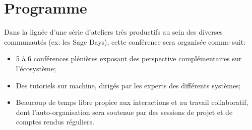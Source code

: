 \documentclass[12pt]{amsart}
\begin{document}
\section*{Programme}
Dans la lignée d'une série d'ateliers très productifs au sein des diverses communautés (ex: les Sage Days), cette conférence sera organisée comme suit:
\begin{itemize}
\item 5 à 6 conférences plénières exposant des perspective complémentaires sur l'écosystème;
\item Des tutoriels sur machine, dirigés par les experts des différents systèmes;
\item Beaucoup de temps libre propice aux interactions et au travail
  collaboratif, dont l'auto-organisation sera soutenue par des
  sessions de projet et de comptes rendus réguliers.
\end{itemize}
\end{document}
